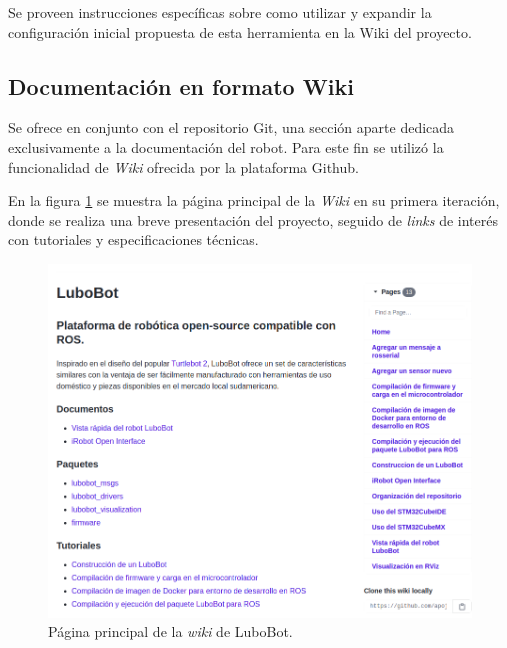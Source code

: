 Se proveen instrucciones específicas sobre como utilizar y expandir la configuración inicial propuesta de esta herramienta en la Wiki del proyecto.

\subsection{Documentación en formato Wiki}

Se ofrece en conjunto con el repositorio Git\protect\footnotemark, una sección aparte dedicada exclusivamente a la documentación del robot. Para este fin se utilizó la funcionalidad de \textit{Wiki} ofrecida por la plataforma Github.



En la figura \ref{fig:wiki} se muestra la página principal de la \textit{Wiki} en su primera iteración, donde se realiza una breve presentación del proyecto, seguido de \textit{links} de interés con tutoriales y especificaciones técnicas.

\begin{figure}[ht]
  \centering
  \includegraphics[scale=0.4]{./Figures/wiki.png}
  \caption{Página principal de la \textit{wiki} de LuboBot.\protect\footnotemark}
  \label{fig:wiki}
\end{figure}


